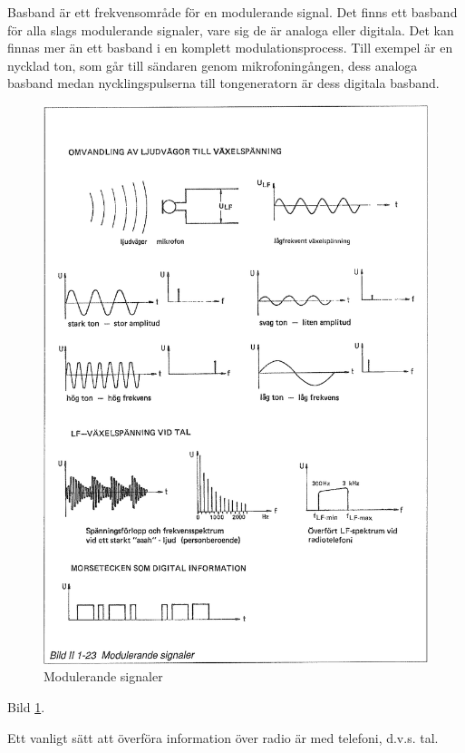 Basband är ett frekvensområde för en modulerande signal. Det finns ett basband
för alla slags modulerande signaler, vare sig de är analoga eller digitala. Det
kan finnas mer än ett basband i en komplett modulationsprocess. Till exempel är
en nycklad ton, som går till sändaren genom mikrofoningången, dess analoga
basband medan nycklingspulserna till tongeneratorn är dess digitala basband.

\begin{figure}
\includegraphics[width=\textwidth]{images/bild_2_1-23}
\caption{Modulerande signaler}
\label{fig:BildII1-23}
\end{figure}

Bild \ref{fig:BildII1-23}.

Ett vanligt sätt att överföra information över radio är med telefoni, d.v.s.
tal.

